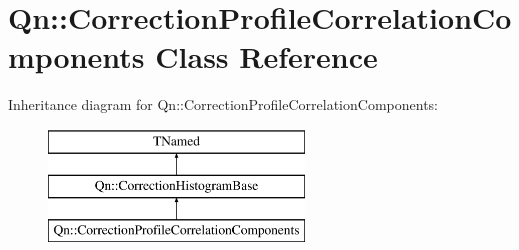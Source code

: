 \hypertarget{classQn_1_1CorrectionProfileCorrelationComponents}{}\section{Qn\+:\+:Correction\+Profile\+Correlation\+Components Class Reference}
\label{classQn_1_1CorrectionProfileCorrelationComponents}
Inheritance diagram for Qn\+:\+:Correction\+Profile\+Correlation\+Components\+:\begin{figure}[H]
\begin{center}
\leavevmode
\includegraphics[height=3.000000cm]{classQn_1_1CorrectionProfileCorrelationComponents}
\end{center}
\end{figure}
